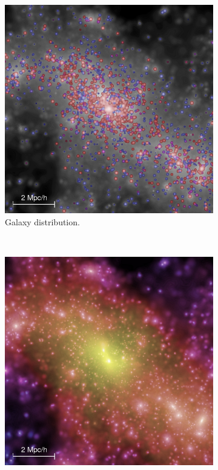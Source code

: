 \documentclass[%
 reprint,
 amsmath,amssymb,
 aps,nofootinbib
]{revtex4-1}
\begin{document}
\begin{figure}
    \centering
    \begin{subfigure}[H]{0.375\textwidth}
        \includegraphics[width=\textwidth]{figs-swe/thesis/ms_galaxies.jpg}
        \caption{Galaxy distribution.}
        \label{ms_galaxies}
    \end{subfigure}
    ~
    \begin{subfigure}[H]{0.375\textwidth}
        \includegraphics[width=\textwidth]{figs-swe/thesis/ms_halos.jpg}

\end{subfigure}
\end{figure}
\end{document}
